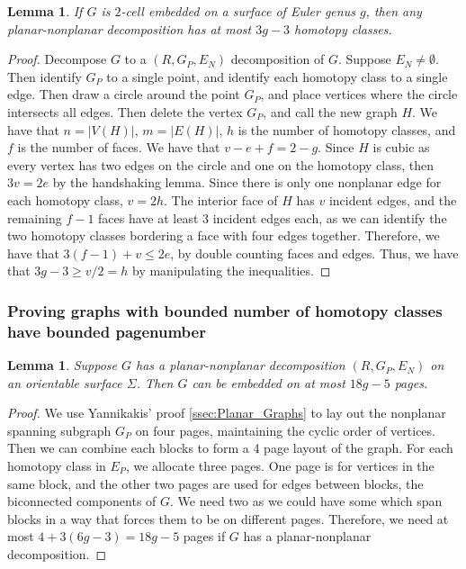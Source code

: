 \documentclass[]{report}
\newtheorem{lemma}[theorem]{Lemma}
\theoremstyle{definition}
\numberwithin{theorem}{section}
\numberwithin{equation}{section}
\begin{document}
\begin{lemma}
	If $G$ is $2$-cell embedded on a surface of Euler genus $g$, then any planar-nonplanar decomposition has at most $3g-3$ homotopy classes. 
\end{lemma}
\begin{proof}
	Decompose $G$ to a $(R, G_P, E_N)$ decomposition of $G$. Suppose $E_N \neq \emptyset$. Then identify $G_P$ to a single point, and identify each homotopy class to a single edge. Then draw a circle around the point $G_P$, and place vertices where the circle intersects all edges. Then delete the vertex $G_P$, and call the new graph $H$. We have that $n = |V(H)|$, $m = |E(H)|$, $h$ is the number of homotopy classes, and $f$ is the number of faces. We have that $v - e + f = 2 - g$. Since $H$ is cubic as every vertex has two edges on the circle and one on the homotopy class, then $3v = 2e$ by the handshaking lemma. Since there is only one nonplanar edge for each homotopy class, $v = 2h$. The interior face of $H$ has $v$ incident edges, and the remaining $f-1$ faces have at least 3 incident edges each, as we can identify the two homotopy classes bordering a face with four edges together. Therefore, we have that $3(f-1) + v \leq 2e$, by double counting faces and edges. Thus, we have that $3g - 3 \geq v/2 = h$ by manipulating the inequalities. 
\end{proof}

\subsubsection{Proving graphs with bounded number of homotopy classes have bounded pagenumber}\label{sssec:bounded_pagenumber_homotopy}
\begin{lemma}\label{lem:planar_nonplanar_orientable}
	Suppose $G$ has a planar-nonplanar decomposition $(R, G_P, E_N)$ on an orientable surface $\Sigma$. Then $G$ can be embedded on at most $18g - 5$ pages.
\end{lemma}
\begin{proof}
	We use Yannikakis' proof \cref{ssec:Planar_Graphs} to lay out the nonplanar spanning subgraph $G_P$ on four pages, maintaining the cyclic order of vertices. Then we can combine each blocks to form a 4 page layout of the graph. For each homotopy class in $E_P$, we allocate three pages. One page is for vertices in the same block, and the other two pages are used for edges between blocks, the biconnected components of $G$. We need two as we could have some which span blocks in a way that forces them to be on different pages. Therefore, we need at most $4 + 3(6g - 3) = 18g-5$ pages if $G$ has a planar-nonplanar decomposition. 
\end{proof}
\end{document}
